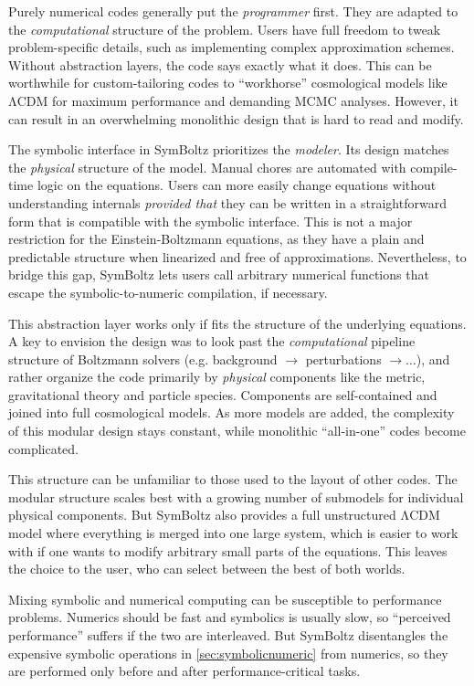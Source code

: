 \documentclass{aa}
\newcommand{\LCDM}{$\mathrm{\Lambda C D M}$}
\begin{document}
Purely numerical codes generally put the \emph{programmer} first.
They are adapted to the \emph{computational} structure of the problem.
Users have full freedom to tweak problem-specific details, such as implementing complex approximation schemes.
Without abstraction layers, the code says exactly what it does.
This can be worthwhile for custom-tailoring codes to \enquote{workhorse} cosmological models like \LCDM{} for maximum performance and demanding MCMC analyses.
However, it can result in an overwhelming monolithic design that is hard to read and modify.

The symbolic interface in SymBoltz prioritizes the \emph{modeler}.
Its design matches the \emph{physical} structure of the model.
Manual chores are automated with compile-time logic on the equations.
Users can more easily change equations without understanding internals \emph{provided that} they can be written in a straightforward form that is compatible with the symbolic interface.
This is not a major restriction for the Einstein-Boltzmann equations, as they have a plain and predictable structure when linearized and free of approximations.
Nevertheless, to bridge this gap, SymBoltz lets users call arbitrary numerical functions that escape the symbolic-to-numeric compilation, if necessary.

This abstraction layer works only if fits the structure of the underlying equations.
A key to envision the design was to look past the \emph{computational} pipeline structure of Boltzmann solvers (e.g. background $\rightarrow$ perturbations $\rightarrow \ldots$), and rather organize the code primarily by \emph{physical} components like the metric, gravitational theory and particle species.
Components are self-contained and joined into full cosmological models.
As more models are added, the complexity of this modular design stays constant, while monolithic \enquote{all-in-one} codes become complicated.

This structure can be unfamiliar to those used to the layout of other codes.
The modular structure scales best with a growing number of submodels for individual physical components.
But SymBoltz also provides a full unstructured \LCDM{} model where everything is merged into one large system, which is easier to work with if one wants to modify arbitrary small parts of the equations.
This leaves the choice to the user, who can select between the best of both worlds.

Mixing symbolic and numerical computing can be susceptible to performance problems.
Numerics should be fast and symbolics is usually slow, so \enquote{perceived performance} suffers if the two are interleaved.
But SymBoltz disentangles the expensive symbolic operations in \cref{sec:symbolicnumeric} from numerics, so they are performed only before and after performance-critical tasks.
\end{document}
